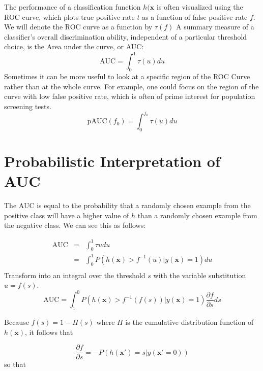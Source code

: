 The performance of a classification function $h(\mathbf{x}$ is often visualized using the ROC curve, which plots true positive rate $t$ as a function of false positive rate $f$. We will denote the ROC curve as a function by $\tau(f)$
A summary measure of a classifier's overall discrimination ability, independent of a particular threshold choice, is the Area under the curve, or AUC:
\begin{equation*}
    \textrm{AUC} = \int_0^1 \tau(u)du
\end{equation*}
Sometimes it can be more useful to look at a specific region of the ROC Curve rather than at the whole curve.  For example, one could focus on the region of the curve with low false positive rate, which is often of prime interest for population screening tests.
\begin{equation*}
     \textrm{pAUC}(f_0) = \int_0^{f_0} \tau(u)du
\end{equation*}

\section{Probabilistic Interpretation of AUC}
The AUC is equal to the probability that a randomly chosen example from the positive class will have a higher value of $h$ than a randomly chosen example from the negative class.  We can see this as follows:

\begin{equation*}
    \begin{array}{lcl}
    \textrm{AUC} & = & \int_0^1 \tau{u}du \\
                 & = & \int_0^1 P\left(h(\mathbf{x}) > f^{-1}(u) | y(\mathbf{x}) = 1\right) du \\
    \end{array}
\end{equation*}
Transform into an integral over the threshold $s$ with the variable substitution $u = f(s)$.
\begin{equation*}
    \textrm{AUC} =  \int_1^0 P\left(h(\mathbf{x}) > f^{-1}( f(s) ) | y(\mathbf{x})=1\right) \frac{\partial f}{\partial s} ds
\end{equation*}

Because $f(s) = 1-H(s)$ where $H$ is the cumulative distribution function of $h(\mathbf{x})$, it follows that

\begin{equation*}
\frac{\partial f}{\partial s} = - P\left(h(\mathbf{x}')=s | y(\mathbf{x}' = 0)\right)
\end{equation*}
so that

